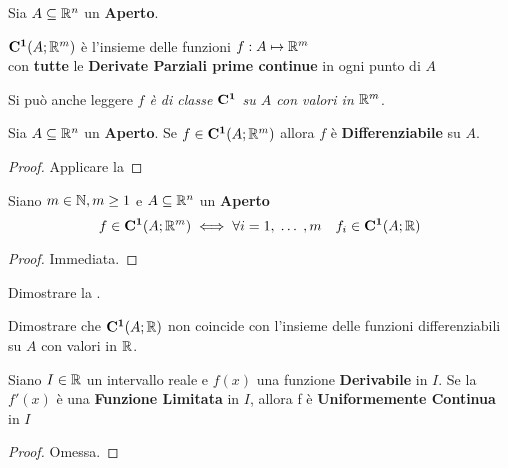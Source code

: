\begin{definition}
	Sia $A \subseteq \mathbb{R}^n$ un \textbf{Aperto}.
	\begin{center}
		$\mathbf{C^{1}}(A; \mathbb{R}^m)$ è l'insieme delle funzioni $f:A \mapsto \mathbb{R}^m$\\
		con \textbf{tutte} le \textbf{Derivate Parziali prime continue} in ogni punto di $A$
	\end{center}
	Si può anche leggere \textit{$f$ è di classe $\mathbf{C^{1}}$ su $A$ con valori in $\mathbb{R}^m$}.
\end{definition}
\begin{corollary}
	Sia $A \subseteq \mathbb{R}^n$ un \textbf{Aperto}. Se $f \in \mathbf{C^{1}}(A;\mathbb{R}^m)$ allora $f$ è \textbf{Differenziabile} su $A$.
	\begin{proof}
		Applicare la 
	\end{proof}
\end{corollary}
\begin{proposition}
	\label{prop:cnt_class_components}
	Siano $m \in \mathbb{N}, m \geq 1$ e $A \subseteq \mathbb{R}^n$ un \textbf{Aperto}
	\[f \in \mathbf{C^{1}}(A; \mathbb{R}^m) \iff \forall i = 1,\;\dotsc\;, m \quad f_i \in \mathbf{C^{1}}(A;\mathbb{R})\]
	\begin{proof}
		Immediata.
	\end{proof}
\end{proposition}
\begin{exercise}
	Dimostrare la .
\end{exercise}
\begin{exercise}
	Dimostrare che $\mathbf{C^{1}}(A;\mathbb{R})$ non coincide con l'insieme delle funzioni differenziabili su $A$ con valori in $\mathbb{R}$.
\end{exercise}
\begin{proposition}
	\label{prop:if_df_lim_then_unif_cont}
	Siano $I \in \mathbb{R}$ un intervallo reale e $f(x)$ una funzione \textbf{Derivabile} in $I$. Se la $f'(x)$ è una \textbf{Funzione Limitata} in $I$, allora f è \textbf{Uniformemente Continua} in $I$ %
	\begin{proof}
		Omessa. %
	\end{proof}
\end{proposition}

